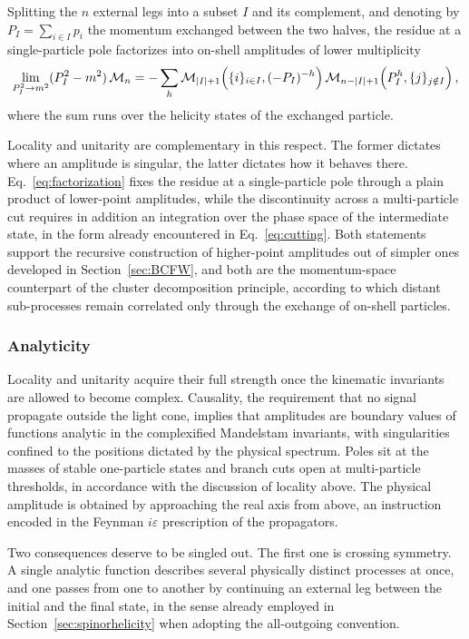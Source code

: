 Splitting the $n$ external legs into a subset $I$ and its complement, and denoting by
$P_I=\sum_{i\in I}p_i$ the momentum exchanged between the two halves, the residue at a
single-particle pole factorizes into on-shell amplitudes of lower multiplicity
\begin{equation}\label{eq:factorization}
    \lim_{P_I^2\to m^2} (P_I^2-m^2)\,\mathcal M_n
    = - \sum_{h}\mathcal M_{\abs{I}+1}\Big(\{i\}_{i\in I},(-P_I)^{-h}\Big)\,
      \mathcal M_{n-\abs{I}+1}\Big(P_I^{h},\{j\}_{j\notin I}\Big)\,,
\end{equation}
where the sum runs over the helicity states of the exchanged particle.

Locality and unitarity are complementary in this respect. The former dictates where an amplitude is
singular, the latter dictates how it behaves there. Eq.~\eqref{eq:factorization} fixes the
residue at a single-particle pole through a plain product of lower-point amplitudes, while the
discontinuity across a multi-particle cut requires in addition an integration over the
phase space of the intermediate state, in the form already encountered in
Eq.~\eqref{eq:cutting}. Both statements support the recursive construction of higher-point
amplitudes out of simpler ones developed in Section~\ref{sec:BCFW}, and both are the
momentum-space counterpart of the cluster decomposition principle, according to which distant sub-processes remain correlated only
through the exchange of on-shell particles.

\subsubsection{Analyticity\label{sec:analyticity}}

Locality and unitarity acquire their full strength once the kinematic invariants are allowed to
become complex. Causality, the requirement that no signal propagate outside the light
cone, implies that amplitudes are boundary values of functions analytic in the complexified
Mandelstam invariants, with singularities confined to the positions dictated by the physical
spectrum. Poles sit at the masses of stable one-particle states and branch cuts open at
multi-particle thresholds, in accordance with the discussion of locality above. The physical
amplitude is obtained by approaching the real axis from above, an instruction encoded in the
Feynman $i\varepsilon$ prescription of the propagators.

Two consequences deserve to be singled out. The first one is crossing symmetry. A single analytic
function describes several physically distinct processes at once, and one passes from one to another
by continuing an external leg between the initial and the final state, in the sense already employed
in Section~\ref{sec:spinorhelicity} when adopting the all-outgoing convention.

